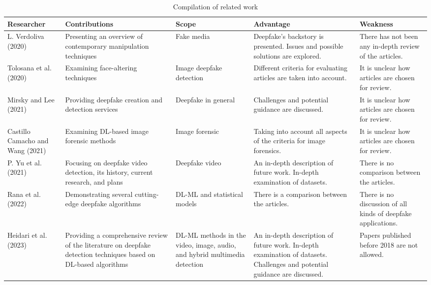 \begin{table}[ht]
  \centering
  \caption{Compilation of related work}
  \small
  \begin{tabular}{|p{2cm}|p{3cm}|p{2.5cm}|p{3cm}|p{3cm}|}
    \hline
    \textbf{Researcher} & \textbf{Contributions} & \textbf{Scope} & \textbf{Advantage} & \textbf{Weakness} \\
    \hline
    L. Verdoliva (2020) & Presenting an overview of contemporary manipulation techniques & Fake media & Deepfake's backstory is presented. Issues and possible solutions are explored. & There has not been any in-depth review of the articles. \\
    \hline
    Tolosana et al. (2020) & Examining face-altering techniques & Image deepfake detection & Different criteria for evaluating articles are taken into account. & It is unclear how articles are chosen for review. \\
    \hline
    Mirsky and Lee (2021) & Providing deepfake creation and detection services & Deepfake in general & Challenges and potential guidance are discussed. & It is unclear how articles are chosen for review. \\
    \hline
    Castillo Camacho and Wang (2021) & Examining DL-based image forensic methods & Image forensic & Taking into account all aspects of the criteria for image forensics. & It is unclear how articles are chosen for review. \\
    \hline
    P. Yu et al. (2021) & Focusing on deepfake video detection, its history, current research, and plans & Deepfake video & An in-depth description of future work. In-depth examination of datasets. & There is no comparison between the articles. \\
    \hline
    Rana et al. (2022) & Demonstrating several cutting-edge deepfake algorithms & DL-ML and statistical models & There is a comparison between the articles. & There is no discussion of all kinds of deepfake applications. \\
    \hline
    Heidari et al. (2023) & Providing a comprehensive review of the literature on deepfake detection techniques based on DL-based algorithms & DL-ML methods in the video, image, audio, and hybrid multimedia detection & An in-depth description of future work. In-depth examination of datasets. Challenges and potential guidance are discussed. & Papers published before 2018 are not allowed.  \\
    \hline
  \end{tabular}
\end{table}

